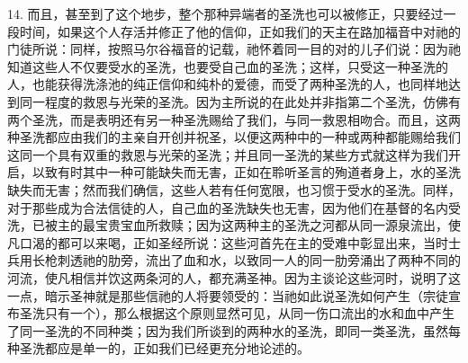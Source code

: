 14. 而且，甚至到了这个地步，整个那种异端者的圣洗也可以被修正，只要经过一段时间，如果这个人存活并修正了他的信仰，正如我们的天主在路加福音中对祂的门徒所说：同样，按照马尔谷福音的记载，祂怀着同一目的对的儿子们说：因为祂知道这些人不仅要受水的圣洗，也要受自己血的圣洗；这样，只受这一种圣洗的人，也能获得洗涤池的纯正信仰和纯朴的爱德，而受了两种圣洗的人，也同样地达到同一程度的救恩与光荣的圣洗。因为主所说的在此处并非指第二个圣洗，仿佛有两个圣洗，而是表明还有另一种圣洗赐给了我们，与同一救恩相吻合。而且，这两种圣洗都应由我们的主亲自开创并祝圣，以便这两种中的一种或两种都能赐给我们这同一个具有双重的救恩与光荣的圣洗；并且同一圣洗的某些方式就这样为我们开启，以致有时其中一种可能缺失而无害，正如在聆听圣言的殉道者身上，水的圣洗缺失而无害；然而我们确信，这些人若有任何宽限，也习惯于受水的圣洗。同样，对于那些成为合法信徒的人，自己血的圣洗缺失也无害，因为他们在基督的名内受洗，已被主的最宝贵宝血所救赎；因为这两种主的圣洗之河都从同一源泉流出，使凡口渴的都可以来喝，正如圣经所说：这些河首先在主的受难中彰显出来，当时士兵用长枪刺透祂的肋旁，流出了血和水，以致同一人的同一肋旁涌出了两种不同的河流，使凡相信并饮这两条河的人，都充满圣神。因为主谈论这些河时，说明了这一点，暗示圣神就是那些信祂的人将要领受的：当祂如此说圣洗如何产生（宗徒宣布圣洗只有一个），那么根据这个原则显然可见，从同一伤口流出的水和血中产生了同一圣洗的不同种类；因为我们所谈到的两种水的圣洗，即同一类圣洗，虽然每种圣洗都应是单一的，正如我们已经更充分地论述的。\par

